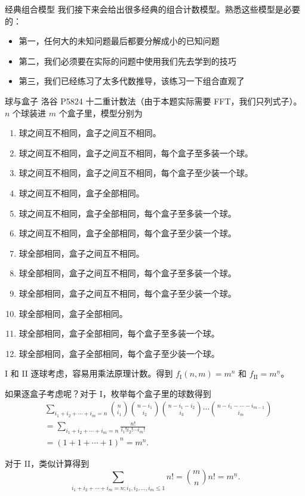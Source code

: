 \begin{frame}{经典组合模型}
    我们接下来会给出很多经典的组合计数模型。熟悉这些模型是必要的：
    \begin{itemize}
        \item 第一，任何大的未知问题最后都要分解成小的已知问题
        \item 第二，我们必须要在实际的问题中使用我们先去学到的技巧
        \item 第三，我们已经练习了太多代数推导，该练习一下组合直观了
    \end{itemize}
\end{frame}
\begin{frame}{球与盒子}
    洛谷 P5824 十二重计数法（由于本题实际需要 FFT，我们只列式子）。$n$ 个球装进 $m$ 个盒子里，模型分别为
    \begin{enumerate}[I]
    \item 球之间互不相同，盒子之间互不相同。
    \item 球之间互不相同，盒子之间互不相同，每个盒子至多装一个球。
    \item 球之间互不相同，盒子之间互不相同，每个盒子至少装一个球。

    \item 球之间互不相同，盒子全部相同。
    \item 球之间互不相同，盒子全部相同，每个盒子至多装一个球。
    \item 球之间互不相同，盒子全部相同，每个盒子至少装一个球。

    \item 球全部相同，盒子之间互不相同。
    \item 球全部相同，盒子之间互不相同，每个盒子至多装一个球。
    \item 球全部相同，盒子之间互不相同，每个盒子至少装一个球。

    \item 球全部相同，盒子全部相同。
    \item 球全部相同，盒子全部相同，每个盒子至多装一个球。
    \item 球全部相同，盒子全部相同，每个盒子至少装一个球。
    \end{enumerate}

\end{frame}
\begin{frame}{I 和 II}
    逐球考虑，容易用乘法原理计数。得到 $f_{\mathrm{I}}(n,m)=m^n$ 和 $f_{\mathrm{II}}=m^{\underline n}$。

    如果逐盒子考虑呢？对于 I，枚举每个盒子里的球数得到
    $$
    \begin{aligned}
    &\sum_{i_1+i_2+\cdots+i_m=n}\binom{n}{i_1}\binom{n-i_1}{i_2}\binom{n-i_1-i_2}{i_3}\cdots\binom{n-i_1-\cdots-i_{m-1}}{i_m}\\
    &=\sum_{i_1+i_2+\cdots+i_m=n}\frac{n!}{i_1!i_2!\cdots i_m!}\\
    &=(1+1+\cdots+1)^n=m^n.
    \end{aligned}
    $$

    对于 II，类似计算得到 
    $$
    \sum_{i_1+i_2+\cdots+i_m=n;i_1,i_2,\ldots,i_m\le 1}n!=\binom{m}{n}n!=m^{\underline{n}}.
    $$
\end{frame}
